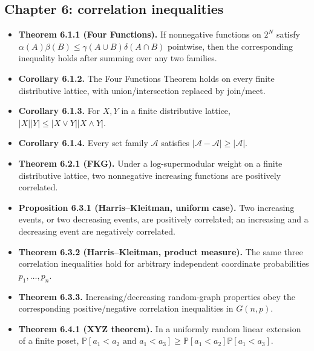\documentclass[10pt]{article}
\newcommand{\Prb}{\mathbb P}
\newcommand{\1}{\mathbf 1}
\begin{document}
\subsection*{Chapter 6: correlation inequalities}
\begin{itemize}
\item \textbf{Theorem 6.1.1 (Four Functions).} If nonnegative functions on
$2^N$ satisfy
$\alpha(A)\beta(B)\leq\gamma(A\cup B)\delta(A\cap B)$ pointwise, then the
corresponding inequality holds after summing over any two families.
\item \textbf{Corollary 6.1.2.} The Four Functions Theorem holds on every
finite distributive lattice, with union/intersection replaced by join/meet.
\item \textbf{Corollary 6.1.3.} For $X,Y$ in a finite distributive lattice,
$|X||Y|\leq|X\vee Y||X\wedge Y|$.
\item \textbf{Corollary 6.1.4.} Every set family $\mathcal A$ satisfies
$|\mathcal A-\mathcal A|\geq|\mathcal A|$.
\item \textbf{Theorem 6.2.1 (FKG).} Under a log-supermodular weight on a
finite distributive lattice, two nonnegative increasing functions are positively
correlated.
\item \textbf{Proposition 6.3.1 (Harris--Kleitman, uniform case).} Two
increasing events, or two decreasing events, are positively correlated; an
increasing and a decreasing event are negatively correlated.
\item \textbf{Theorem 6.3.2 (Harris--Kleitman, product measure).} The same
three correlation inequalities hold for arbitrary independent coordinate
probabilities $p_1,\ldots,p_n$.
\item \textbf{Theorem 6.3.3.} Increasing/decreasing random-graph properties
obey the corresponding positive/negative correlation inequalities in $G(n,p)$.
\item \textbf{Theorem 6.4.1 (XYZ theorem).} In a uniformly random linear
extension of a finite poset,
$\Prb[a_1<a_2\text{ and }a_1<a_3]\geq
\Prb[a_1<a_2]\Prb[a_1<a_3]$.
\end{itemize}
\end{document}
